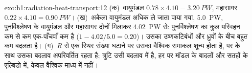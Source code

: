 \begin{solution}{exo:b1:radiation-heat-transport:12}
(क)~वायुमंडल $0.78 \times 4.10 = \qty{3.20}{PW}$, महासागर $0.22 \times 4.10 =
\qty{0.90}{PW}$। (ख)~अकेला वायुमंडल अधिक ले जाता पाया गया, \qty{5.0}{PW},
पुनर्विश्लेषण के वायुमंडल और महासागर दोनों मिलाकर \qty{4.02}{PW} से: पुनर्विश्लेषण का
कुल परिवहन कम से कम एक-पाँचवाँ कम है ($1 - 4.02/5.0 = 0.20$)।
उसका  उष्णकटिबंधों और ध्रुवों के बीच बहुत कम बदलता है। (ग)~$R$ से एक स्थिर संख्या घटाने पर उसका वैश्विक समाकल शून्य होता है, पर  के साथ उसका बदलाव अपरिवर्तित रहता है;
त्रुटि उसी बदलाव में है, हर  पर मॉडल के बादलों और सतहों के एल्बिडो में, केवल वैश्विक माध्य में नहीं।
\end{solution}

